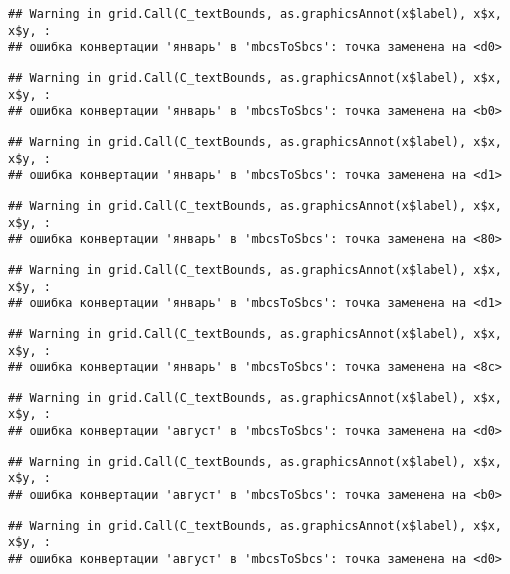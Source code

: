 \documentclass[
]{article}
\begin{document}
\begin{verbatim}
## Warning in grid.Call(C_textBounds, as.graphicsAnnot(x$label), x$x, x$y, :
## ошибка конвертации 'январь' в 'mbcsToSbcs': точка заменена на <d0>
\end{verbatim}

\begin{verbatim}
## Warning in grid.Call(C_textBounds, as.graphicsAnnot(x$label), x$x, x$y, :
## ошибка конвертации 'январь' в 'mbcsToSbcs': точка заменена на <b0>
\end{verbatim}

\begin{verbatim}
## Warning in grid.Call(C_textBounds, as.graphicsAnnot(x$label), x$x, x$y, :
## ошибка конвертации 'январь' в 'mbcsToSbcs': точка заменена на <d1>
\end{verbatim}

\begin{verbatim}
## Warning in grid.Call(C_textBounds, as.graphicsAnnot(x$label), x$x, x$y, :
## ошибка конвертации 'январь' в 'mbcsToSbcs': точка заменена на <80>
\end{verbatim}

\begin{verbatim}
## Warning in grid.Call(C_textBounds, as.graphicsAnnot(x$label), x$x, x$y, :
## ошибка конвертации 'январь' в 'mbcsToSbcs': точка заменена на <d1>
\end{verbatim}

\begin{verbatim}
## Warning in grid.Call(C_textBounds, as.graphicsAnnot(x$label), x$x, x$y, :
## ошибка конвертации 'январь' в 'mbcsToSbcs': точка заменена на <8c>
\end{verbatim}

\begin{verbatim}
## Warning in grid.Call(C_textBounds, as.graphicsAnnot(x$label), x$x, x$y, :
## ошибка конвертации 'август' в 'mbcsToSbcs': точка заменена на <d0>
\end{verbatim}

\begin{verbatim}
## Warning in grid.Call(C_textBounds, as.graphicsAnnot(x$label), x$x, x$y, :
## ошибка конвертации 'август' в 'mbcsToSbcs': точка заменена на <b0>
\end{verbatim}

\begin{verbatim}
## Warning in grid.Call(C_textBounds, as.graphicsAnnot(x$label), x$x, x$y, :
## ошибка конвертации 'август' в 'mbcsToSbcs': точка заменена на <d0>
\end{verbatim}
\end{document}
